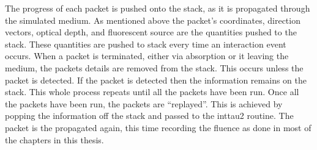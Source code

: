 \begin{appendices}
The progress of each packet is pushed onto the stack, as it is propagated through the simulated medium. 
As mentioned above the packet's coordinates, direction vectors, optical depth, and fluorescent source are the quantities pushed to the stack.
These quantities are pushed to stack every time an interaction event occurs.
When a packet is terminated, either via absorption or it leaving the medium, the packets details are removed from the stack.
This occurs unless the packet is detected.
If the packet is detected then the information remains on the stack.
This whole process repeats until all the packets have been run.
Once all the packets have been run, the packets are ``replayed''.
This is achieved by popping the information off the stack and passed to the inttau2 routine.
The packet is the propagated again, this time recording the fluence as done in most of the chapters in this thesis.

\end{appendices}
